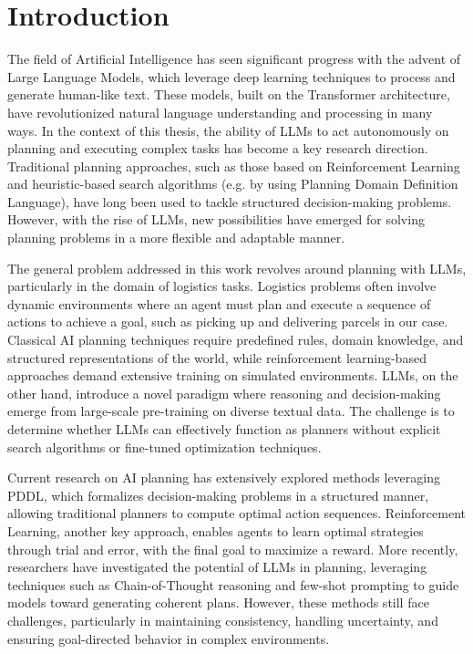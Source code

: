 \chapter{Introduction}
\label{cha:introduction}

The field of Artificial Intelligence has seen significant progress with the
advent of Large Language Models, which leverage deep learning techniques to process
and generate human-like text. These models, built on the Transformer architecture,
have revolutionized natural language understanding and processing in many ways. In
the context of this thesis, the ability of LLMs to act autonomously on planning
and executing complex tasks has become a key research direction. Traditional planning
approaches, such as those based on Reinforcement Learning and heuristic-based
search algorithms (e.g. by using Planning Domain Definition Language), have long
been used to tackle structured decision-making problems. However, with the rise
of LLMs, new possibilities have emerged for solving planning problems in a more flexible
and adaptable manner.

The general problem addressed in this work revolves around planning with LLMs,
particularly in the domain of logistics tasks. Logistics problems often involve dynamic
environments where an agent must plan and execute a sequence of actions to achieve
a goal, such as picking up and delivering parcels in our case. Classical AI planning
techniques require predefined rules, domain knowledge, and structured representations
of the world, while reinforcement learning-based approaches demand extensive
training on simulated environments. LLMs, on the other hand, introduce a novel paradigm
where reasoning and decision-making emerge from large-scale pre-training on diverse
textual data. The challenge is to determine whether LLMs can effectively
function as planners without explicit search algorithms or fine-tuned
optimization techniques.

Current research on AI planning has extensively explored methods leveraging PDDL,
which formalizes decision-making problems in a structured manner, allowing
traditional planners to compute optimal action sequences. Reinforcement Learning,
another key approach, enables agents to learn optimal strategies through trial and
error, with the final goal to maximize a reward. More recently, researchers have
investigated the potential of LLMs in planning, leveraging techniques such as Chain-of-Thought
reasoning and few-shot prompting to guide models toward generating coherent plans.
However, these methods still face challenges, particularly in maintaining
consistency, handling uncertainty, and ensuring goal-directed behavior in
complex environments.

